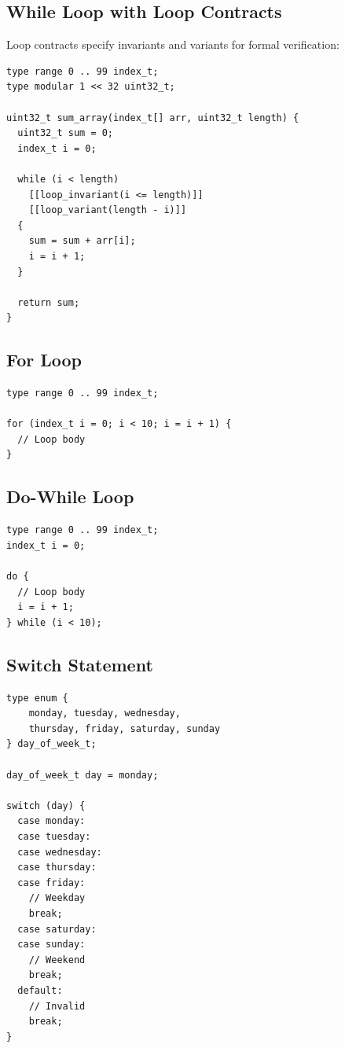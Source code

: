 \documentclass[11pt,letterpaper,twoside,openany]{book}
\begin{document}
\subsection{While Loop with Loop Contracts}

Loop contracts specify invariants and variants for formal verification:

\begin{lstlisting}
type range 0 .. 99 index_t;
type modular 1 << 32 uint32_t;

uint32_t sum_array(index_t[] arr, uint32_t length) {
  uint32_t sum = 0;
  index_t i = 0;

  while (i < length)
    [[loop_invariant(i <= length)]]
    [[loop_variant(length - i)]]
  {
    sum = sum + arr[i];
    i = i + 1;
  }

  return sum;
}
\end{lstlisting}

\subsection{For Loop}
\begin{lstlisting}
type range 0 .. 99 index_t;

for (index_t i = 0; i < 10; i = i + 1) {
  // Loop body
}
\end{lstlisting}

\subsection{Do-While Loop}
\begin{lstlisting}
type range 0 .. 99 index_t;
index_t i = 0;

do {
  // Loop body
  i = i + 1;
} while (i < 10);
\end{lstlisting}

\subsection{Switch Statement}
\begin{lstlisting}
type enum {
    monday, tuesday, wednesday,
    thursday, friday, saturday, sunday
} day_of_week_t;

day_of_week_t day = monday;

switch (day) {
  case monday:
  case tuesday:
  case wednesday:
  case thursday:
  case friday:
    // Weekday
    break;
  case saturday:
  case sunday:
    // Weekend
    break;
  default:
    // Invalid
    break;
}
\end{lstlisting}
\end{document}
